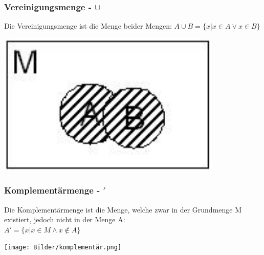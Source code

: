 \documentclass{article}
\begin{document}
	\subsubsection{Vereinigungsmenge - \texorpdfstring{$\cup$}{}}
	Die Vereinigungsmenge ist die Menge beider Mengen: $A \cup B = \{x|x \in A \lor x \in B \}$ \\
	\begin{center}
	\includegraphics[scale=0.5]{Bilder/vereinigung.png}
	\end{center}
	\subsubsection{Komplementärmenge - \texorpdfstring{$'$}{}}
	Die Komplementärmenge ist die Menge, welche zwar in der Grundmenge M existiert, jedoch nicht in der Menge A: \\
	$A' = \{x|x \in M \land x \notin A \}$ \\
	\begin{center}
	\texttt{[image: Bilder/komplementär.png]}
	\end{center}
\end{document}

